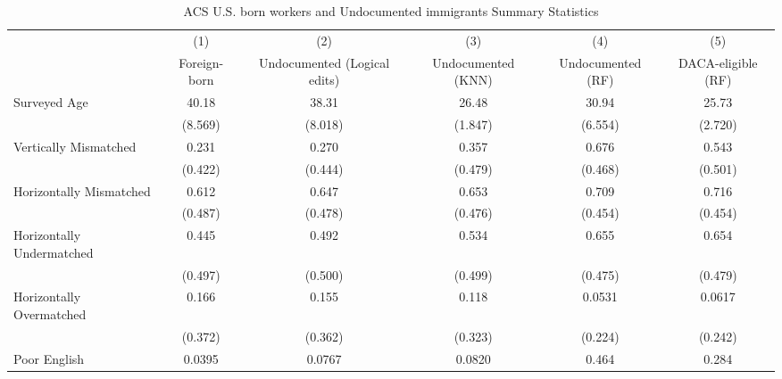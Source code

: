 \begin{table}[htbp]\centering
\def\sym#1{\ifmmode^{#1}\else\(^{#1}\)\fi}
\caption{ACS U.S. born workers and Undocumented immigrants Summary Statistics \label{tab:sum}}
\begin{tabular}{l*{5}{c}}
\hline\hline
                    &\multicolumn{1}{c}{(1)}         &\multicolumn{1}{c}{(2)}         &\multicolumn{1}{c}{(3)}         &\multicolumn{1}{c}{(4)}         &\multicolumn{1}{c}{(5)}         \\
                    &Foreign-born         &Undocumented (Logical edits)         &Undocumented (KNN)         &Undocumented (RF)         &DACA-eligible (RF)         \\
\hline
Surveyed Age        &       40.18         &       38.31         &       26.48         &       30.94         &       25.73         \\
                    &     (8.569)         &     (8.018)         &     (1.847)         &     (6.554)         &     (2.720)         \\
[1em]
Vertically Mismatched&       0.231         &       0.270         &       0.357         &       0.676         &       0.543         \\
                    &     (0.422)         &     (0.444)         &     (0.479)         &     (0.468)         &     (0.501)         \\
[1em]
Horizontally Mismatched&       0.612         &       0.647         &       0.653         &       0.709         &       0.716         \\
                    &     (0.487)         &     (0.478)         &     (0.476)         &     (0.454)         &     (0.454)         \\
[1em]
Horizontally Undermatched&       0.445         &       0.492         &       0.534         &       0.655         &       0.654         \\
                    &     (0.497)         &     (0.500)         &     (0.499)         &     (0.475)         &     (0.479)         \\
[1em]
Horizontally Overmatched&       0.166         &       0.155         &       0.118         &      0.0531         &      0.0617         \\
                    &     (0.372)         &     (0.362)         &     (0.323)         &     (0.224)         &     (0.242)         \\
[1em]
Poor English        &      0.0395         &      0.0767         &      0.0820         &       0.464         &       0.284         \\

\end{tabular}
\end{table}
